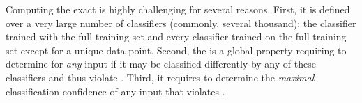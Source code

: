 
Computing the exact \propa is highly challenging for several reasons. 
First, it is defined over a very large number of classifiers (commonly, several thousand): the classifier trained with the full training set and every classifier trained on the full training set except for a unique data point.
Second, the \propa is a global property requiring to determine for \emph{any} input if it may be classified differently by any of these classifiers and thus violate \propi. Third, it requires to determine the \emph{maximal} classification confidence of any input that violates \propi. %


